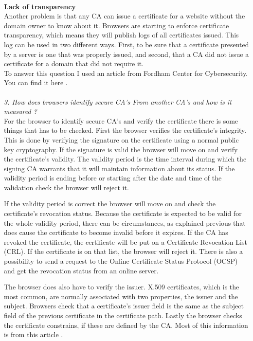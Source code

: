 \documentclass[12pt, letterpaper]{article}
\begin{document}
\\
\textbf{Lack of transparency}
\\
Another problem is that any CA can issue a certificate for a website without the domain owner to know about it. Browsers are starting to enforce certificate transparency, which means they will publish logs of all certificates issued. This log can be used in two different ways. First, to be sure that a certificate presented by a server is one that was properly issued, and second, that a CA did not issue a certificate for a domain that did not require it.
\\
To answer this question I used an article from Fordham Center for Cybersecurity. You can find it here \cite{ca}.
\\\\
\textit{3. How does browsers identify secure CA's From another CA's and how is it measured ?}\\
For the browser to identify secure CA's and verify the certificate there is some things that has to be checked. First the browser verifies the certificate's integrity. This is done by verifying the signature on the certificate using a normal public key cryptography. If the signature is valid the browser will move on and verify the certificate's validity. The validity period is the time interval during which the signing CA warrants that it will maintain information about its status. If the validity period is ending before or starting after the date and time of the validation check the browser will reject it. 

If the validity period is correct the browser will move on and check the certificate's revocation status. Because the certificate is expected to be valid for the whole validity period, there can be circumstances, as explained previous that does cause the certificate to become invalid before it expires. If the CA has revoked the certificate, the certificate will be put on a Certificate Revocation List (CRL). If the certificate is on that list, the browser will reject it. There is also a possibility to send a request to the Online Certificate Status Protocol (OCSP) and get the revocation status from an online server.

The browser does also have to verify the issuer. X.509 certificates, which is the most common, are normally associated with two properties, the issuer and the subject. Browsers check that a certificate's issuer field is the same as the subject field of the previous certificate in the certificate path. Lastly the browser checks the certificate constrains, if these are defined by the CA. Most of this information is from this article \cite{browser}.
\end{document}
